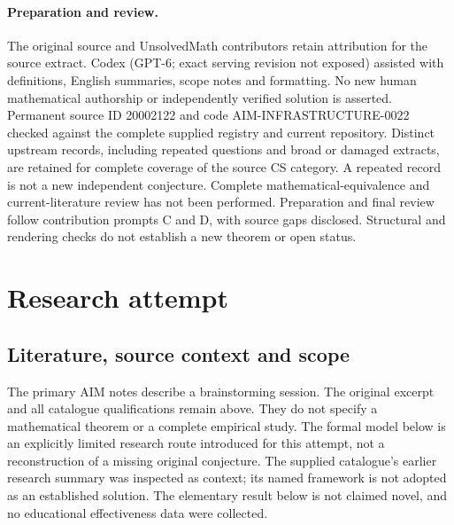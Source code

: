 \documentclass[11pt]{article}
\begin{document}
\paragraph{Preparation and review.}
The original source and UnsolvedMath contributors retain attribution for the source extract. Codex (GPT-6; exact serving revision not exposed) assisted with definitions, English summaries, scope notes and formatting. No new human mathematical authorship or independently verified solution is asserted. Permanent source ID 20002122 and code AIM-INFRASTRUCTURE-0022 checked against the complete supplied registry and current repository. Distinct upstream records, including repeated questions and broad or damaged extracts, are retained for complete coverage of the source CS category. A repeated record is not a new independent conjecture. Complete mathematical-equivalence and current-literature review has not been performed. Preparation and final review follow contribution prompts C and D, with source gaps disclosed. Structural and rendering checks do not establish a new theorem or open status.
\label{end:20002122}

\section{Research attempt}
\subsection{Literature, source context and scope}
The primary AIM notes describe a brainstorming session. The original excerpt and all catalogue qualifications remain above. They do not specify a mathematical theorem or a complete empirical study. The formal model below is an explicitly limited research route introduced for this attempt, not a reconstruction of a missing original conjecture. The supplied catalogue's earlier research summary was inspected as context; its named framework is not adopted as an established solution. The elementary result below is not claimed novel, and no educational effectiveness data were collected.
\end{document}
